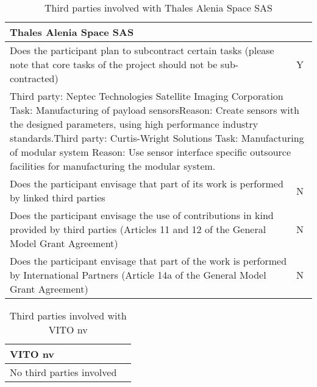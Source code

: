 \begin{table}[H]
	\centering
	\begin{tabular}{|p{10cm}|p{4cm}|}
		\hline
		
		\multicolumn{2}{|p{14cm}|}{\textbf{Thales Alenia Space SAS}}\\
		
		\hline
		
		Does the participant plan to subcontract certain tasks (please note that core tasks of the project should not be sub-contracted) & Y\\
		
		\hline
		
		\multicolumn{2}{|p{14cm}|}{Third party: Neptec Technologies Satellite Imaging Corporation \newline Task: Manufacturing of payload sensors\newline Reason: Create sensors with the designed parameters, using high performance industry standards.\vspace{0.2cm}\newline Third party: Curtis-Wright Solutions \newline Task: Manufacturing of modular system \newline Reason: Use sensor interface specific outsource facilities for manufacturing the modular system.}\\
		
		\hline
		
		Does the participant envisage that part of its work is performed by linked third parties & N\\
		
		\hline
		
		Does the participant envisage the use of contributions in kind provided by third parties (Articles 11 and 12 of the General Model Grant Agreement) & N\\
		
		\hline
		
		Does the participant envisage that part of the work is performed by International Partners (Article 14a of the General Model Grant Agreement) & N\\
		
		\hline
		
	\end{tabular}
	\caption{Third parties involved with Thales Alenia Space SAS}
\end{table}



\begin{table}[H]
	\centering
	\begin{tabular}{|p{10cm} p{4cm}|}
		\hline
		
		\multicolumn{2}{|p{14cm}|}{\textbf{VITO nv}}\\
		
		\hline
		
		No third parties involved & \\
		
		\hline
	\end{tabular}
	\caption{Third parties involved with VITO nv}
\end{table}